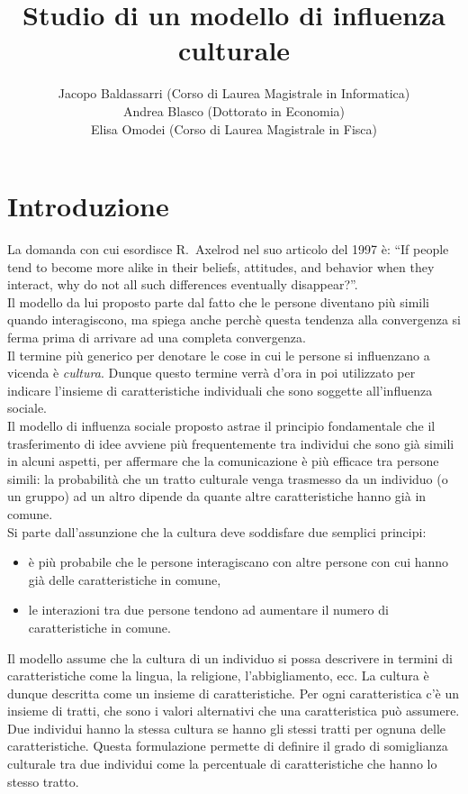 \documentclass[a4paper,12pt]{article}
\title{\textbf{Studio di un modello di influenza culturale}}
\author{Jacopo Baldassarri (Corso di Laurea Magistrale in Informatica) \\Andrea Blasco (Dottorato in Economia) \\Elisa Omodei (Corso di Laurea Magistrale in Fisca)}
\begin{document}
\maketitle

\begin{abstract}
\end{abstract}

\clearpage
\section{Introduzione}
La domanda con cui esordisce R.~Axelrod nel suo articolo del 1997 \cite{Axelrod} \`{e}: \textquotedblleft If people tend to become 
more alike in their beliefs, attitudes, and behavior when they interact, why do not all such differences eventually disappear?\textquotedblright .
\\Il modello da lui proposto parte dal fatto che le persone diventano pi\`{u} simili quando interagiscono, ma spiega anche perch\`{e}
questa tendenza alla convergenza si ferma prima di arrivare ad una completa convergenza.
\\Il termine pi\`{u} generico per denotare le cose in cui le persone si influenzano a vicenda \`{e} \textit{cultura}.
Dunque questo termine verr\`{a} d'ora in poi utilizzato per indicare l'insieme di caratteristiche individuali che sono soggette all'influenza sociale.
\\Il modello di influenza sociale proposto astrae il principio fondamentale che il trasferimento di idee avviene pi\`{u} frequentemente
tra individui che sono gi\`{a} simili in alcuni aspetti, per affermare che la comunicazione \`{e} pi\`{u} efficace tra persone simili:
la probabilit\`{a} che un tratto culturale venga trasmesso da un individuo (o un gruppo) ad un altro dipende da quante altre caratteristiche
hanno gi\`{a} in comune.
\\Si parte dall'assunzione che la cultura deve soddisfare due semplici principi: 
\begin{itemize}
\item \`{e} pi\`{u} probabile che le persone interagiscano con altre persone con cui hanno gi\`{a} delle caratteristiche in comune,
\item le interazioni tra due persone tendono ad aumentare il numero di caratteristiche in comune.
\end{itemize}
Il modello assume che la cultura di un individuo si possa descrivere in termini di caratteristiche come la lingua, la religione,
l'abbigliamento, ecc. La cultura \`{e} dunque descritta come un insieme di caratteristiche. 
Per ogni caratteristica c'\`{e} un insieme di tratti, che sono i valori alternativi che una caratteristica pu\`{o} assumere.
Due individui hanno la stessa cultura se hanno gli stessi tratti per ognuna delle caratteristiche. 
Questa formulazione permette di definire il grado di somiglianza culturale tra due individui come la percentuale di caratteristiche che hanno lo stesso tratto.
\end{document}
